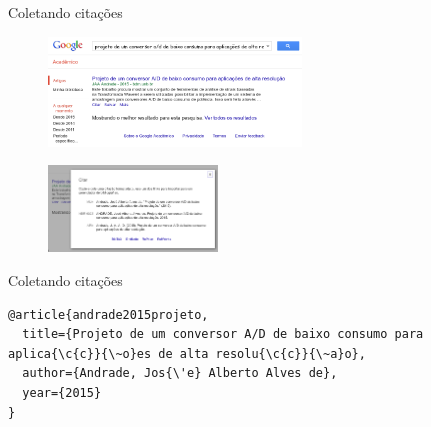\begin{frame}{Coletando citações}
	
\begin{multicols}{2}
\begin{figure}[htbp!]
	\includegraphics[width=0.6\textwidth]{figuras/google2.png}
	\caption{ }
\end{figure}
	
\begin{figure}[htbp!]
	\centering
	\includegraphics[width=0.4\textwidth]{figuras/google3.png}
	\caption{ }
\end{figure}
\end{multicols}
\end{frame}

\begin{frame}[fragile]{Coletando citações}

\begin{lstlisting}[linewidth=10cm]
@article{andrade2015projeto,
  title={Projeto de um conversor A/D de baixo consumo para aplica{\c{c}}{\~o}es de alta resolu{\c{c}}{\~a}o},
  author={Andrade, Jos{\'e} Alberto Alves de},
  year={2015}
}
\end{lstlisting}
	
\end{frame}